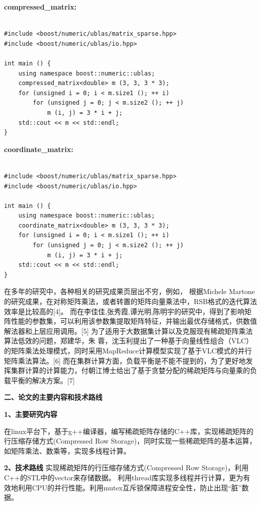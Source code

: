 \documentclass{article}
\begin{document}
\textbf{compressed\_matrix:}
\begin{lstlisting}

#include <boost/numeric/ublas/matrix_sparse.hpp>
#include <boost/numeric/ublas/io.hpp>

int main () {
    using namespace boost::numeric::ublas;
    compressed_matrix<double> m (3, 3, 3 * 3);
    for (unsigned i = 0; i < m.size1 (); ++ i)
        for (unsigned j = 0; j < m.size2 (); ++ j)
            m (i, j) = 3 * i + j;
    std::cout << m << std::endl;
}

\end{lstlisting}

\textbf{coordinate\_matrix:}
\begin{lstlisting}

#include <boost/numeric/ublas/matrix_sparse.hpp>
#include <boost/numeric/ublas/io.hpp>

int main () {
    using namespace boost::numeric::ublas;
    coordinate_matrix<double> m (3, 3, 3 * 3);
    for (unsigned i = 0; i < m.size1 (); ++ i)
        for (unsigned j = 0; j < m.size2 (); ++ j)
            m (i, j) = 3 * i + j;
    std::cout << m << std::endl;
}
\end{lstlisting}


在多年的研究中，各种相关的研究成果页层出不穷，例如，
根据Michele Martone的研究成果，在对称矩阵乘法，或者转置的矩阵向量乘法中，RSB格式的迭代算法效率是比较高的[4]。
而在李佳佳,张秀霞,谭光明,陈明宇的研究中，得到了影响矩阵性能的参数集，可以利用该参数集提取矩阵特征，并输出最优存储格式，供数值解法器和上层应用调用。[5]
为了适用于大数据集计算以及克服现有稀疏矩阵乘法算法低效的问题，郑建华，朱 蓉，沈玉利提出了一种基于向量线性组合（VLC）的矩阵乘法处理模式，同时采用MapReduce计算模型实现了基于VLC模式的并行矩阵乘法算法。[6]
而在集群计算方面，负载平衡是不能不提到的，为了更好地发挥集群计算的计算能力，付朝江博士给出了基于贪婪分配的稀疏矩阵与向量乘的负载平衡的解决方案。[7]
\newline


\textbf{二、论文的主要内容和技术路线}
      \qquad
\newline

     \textbf{1、主要研究内容} \qquad
\newline
     
     在linux平台下，基于g++编译器，编写稀疏矩阵存储的C++库，实现稀疏矩阵的行压缩存储方式(Compressed Row Storage)，同时实现一些稀疏矩阵的基本运算，如矩阵乘法、数乘等，实现多线程计算。
\newline

     \textbf{2、技术路线} \qquad
\newline
实现稀疏矩阵的行压缩存储方式(Compressed Row Storage)，利用C++的STL中的vector来存储数据。
\newline
     利用thread库实现多线程并行计算，更为有效地利用CPU的并行性能。利用mutex互斥锁保障进程安全性，防止出现“脏”数据。
\newline
	
\end{document}
